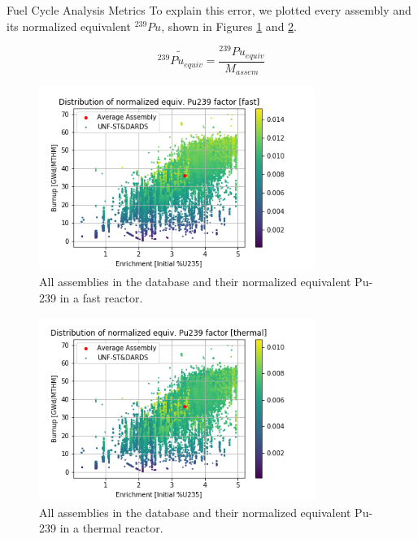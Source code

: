 \documentclass[final]{beamer}
\newlength{\onecolwid}
\newlength{\threecolwid}
\begin{document}
\begin{frame}[t]
\begin{columns}[t,totalwidth=\threecolwid]
\begin{column}{\onecolwid}
\begin{block}{Fuel Cycle Analysis Metrics}
To explain this error, we plotted every assembly and its
normalized equivalent $^{239}Pu$, shown in Figures \ref{fig:fast_all} and \ref{fig:thermal_all}.

\[ \widetilde{^{239}Pu_{equiv}} = \frac{^{239}Pu_{equiv}}{M_{assem}}\]

\begin{figure}
    \centering
    \includegraphics[width=0.8\textwidth]{../images/fast_all.png}
    \caption{All assemblies in the database and their normalized equivalent Pu-239 in a fast reactor.}
    \label{fig:fast_all}
\end{figure}

\begin{figure}
    \centering
    \includegraphics[width=0.8\textwidth]{../images/thermal_all.png}
    \caption{All assemblies in the database and their normalized equivalent Pu-239 in a thermal reactor.}
    \label{fig:thermal_all}
\end{figure}
\end{block}


\end{column}
\end{columns}
\end{frame}
\end{document}
